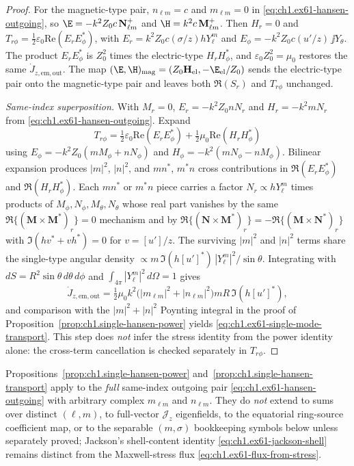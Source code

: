\begin{proof}
For the magnetic-type pair, $n_{\ell m}=c$ and $m_{\ell m}=0$ in \eqref{eq:ch1.ex61-hansen-outgoing}, so $\E=-k^2 Z_0 c\,\mathbf N_{\ell m}^+$ and $\H=k^2 c\,\mathbf M_{\ell m}^+$. Then $H_r=0$ and $T_{r\phi}=\tfrac12\varepsilon_0\mathrm{Re}(E_r E_\phi^*)$, with $E_r=k^2 Z_0 c(\sigma/z)h Y_\ell^m$ and $E_\phi=-k^2 Z_0 c(u'/z)\,\jj Y_\theta$. The product $E_r E_\phi^*$ is $Z_0^2$ times the electric-type $H_r H_\phi^*$, and $\varepsilon_0 Z_0^2=\mu_0$ restores the same $\dot J_{z,\mathrm{em,out}}$. The map $(\E,\H)_{\mathrm{mag}}=(Z_0\mathbf H_{\mathrm{el}},-\E_{\mathrm{el}}/Z_0)$ sends the electric-type pair onto the magnetic-type pair and leaves both $\Re(S_r)$ and $T_{r\phi}$ unchanged.

\medskip\noindent\emph{Same-index superposition.}
With $M_r=0$, $E_r=-k^2 Z_0 n N_r$ and $H_r=-k^2 m N_r$ from \eqref{eq:ch1.ex61-hansen-outgoing}. Expand
\[
T_{r\phi}
=\tfrac12\varepsilon_0\mathrm{Re}(E_r E_\phi^*)
+\tfrac12\mu_0\mathrm{Re}(H_r H_\phi^*)
\]
using $E_\phi=-k^2 Z_0(m M_\phi+n N_\phi)$ and $H_\phi=-k^2(m N_\phi-n M_\phi)$. Bilinear expansion produces $|m|^2$, $|n|^2$, and $mn^*$, $m^*n$ cross contributions in $\Re(E_r E_\phi^*)$ and $\Re(H_r H_\phi^*)$. Each $mn^*$ or $m^*n$ piece carries a factor $N_r\propto h Y_\ell^m$ times products of $M_\phi,N_\phi,M_\theta,N_\theta$ whose real part vanishes by the same $\Re\{(\mathbf M\times\mathbf M^*)_r\}=0$ mechanism and by $\Re\{(\mathbf N\times\mathbf M^*)_r\}=-\Re\{(\mathbf M\times\mathbf N^*)_r\}$ with $\Im(h v^*+v h^*)=0$ for $v=[u']/z$. The surviving $|m|^2$ and $|n|^2$ terms share the single-type angular density $\propto m\,\Im(h[u']^*)\,|Y_\ell^m|^2/\sin\theta$. Integrating with $dS=R^2\sin\theta\,d\theta\,d\phi$ and $\int_{4\pi}|Y_\ell^m|^2\,d\Omega=1$ gives
\[
\dot J_{z,\mathrm{em,out}}=\tfrac12\mu_0 k^2\bigl(|m_{\ell m}|^2+|n_{\ell m}|^2\bigr) m R\,\Im(h[u']^*),
\]
and comparison with the $|m|^2+|n|^2$ Poynting integral in the proof of Proposition~\ref{prop:ch1.single-hansen-power} yields \eqref{eq:ch1.ex61-single-mode-transport}. This step does \emph{not} infer the stress identity from the power identity alone: the cross-term cancellation is checked separately in $T_{r\phi}$.
\end{proof}

\begin{remark}
\label{rem:ch1.single-multipole-scope}
Propositions~\ref{prop:ch1.single-hansen-power} and~\ref{prop:ch1.single-hansen-transport} apply to the \emph{full} same-index outgoing pair \eqref{eq:ch1.ex61-hansen-outgoing} with arbitrary complex $m_{\ell m}$ and $n_{\ell m}$. They do \emph{not} extend to sums over distinct $(\ell,m)$, to full-vector $\mathcal{J}_z$ eigenfields, to the equatorial ring-source coefficient map, or to the separable $(m,\sigma)$ bookkeeping symbols below unless separately proved; Jackson's shell-content identity \eqref{eq:ch1.ex61-jackson-shell} remains distinct from the Maxwell-stress flux \eqref{eq:ch1.ex61-flux-from-stress}.
\end{remark}

